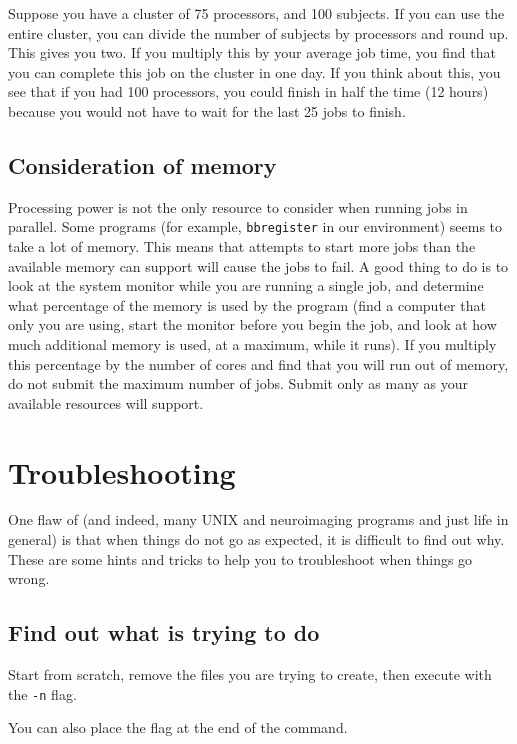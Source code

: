 Suppose you have a cluster of 75 processors, and 100 subjects. If you can use the entire cluster, you can divide the number of subjects by processors and round up. This gives you two. If you multiply this by your average job time, you find that you can complete this job on the cluster in one day. If you think about this, you see that if you had 100 processors, you could finish in half the time (12 hours) because you would not have to wait for the last 25 jobs to finish.

\subsection{Consideration of memory}

Processing power is not the only resource to consider when running jobs in parallel. Some programs (for example, \texttt{bbregister} in our environment) seems to take a lot of memory. This means that attempts to start more jobs than the available memory can support will cause the jobs to fail. A good thing to do is to look at the system monitor while you are running a single job, and determine what percentage of the memory is used by the program (find a computer that only you are using, start the monitor before you begin the job, and look at how much additional memory is used, at a maximum, while it runs). If you multiply this percentage by the number of cores and find that you will run out of memory, do not submit the maximum number of jobs. Submit only as many as your available resources will support.

\section{Troubleshooting \maken}

One flaw of \maken{} (and indeed, many UNIX and neuroimaging programs and just life in general) is that when things do not go as expected, it is difficult to find out why. These are some hints and tricks to help you to troubleshoot when things go wrong.

\subsection{Find out what \maken{} is trying to do}

Start from scratch, remove the files you are trying to create, then execute \maken{} with the \texttt{-n} flag.

You can also place the flag at the end of the command.

